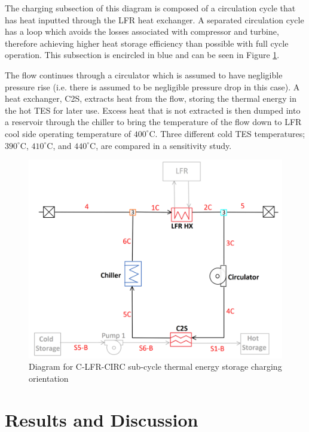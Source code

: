 \begin{paracol}{2}
\linenumbers
\switchcolumn

The charging subsection of this diagram is composed of a circulation cycle that has heat inputted through the LFR heat exchanger. A separated circulation cycle has a loop which avoids the losses associated with compressor and turbine, therefore achieving higher heat storage efficiency than possible with full cycle operation. This subsection is encircled in blue and can be seen in Figure \ref{c-lfr-circ-sub}.

The flow continues through a circulator which is assumed to have negligible pressure rise (i.e. there is assumed to be negligible pressure drop in this case). A heat exchanger, C2S, extracts heat from the flow, storing the thermal energy in the hot TES for later use. Excess heat that is not extracted is then dumped into a reservoir through the chiller to bring the temperature of the flow down to LFR cool side operating temperature of $400^{\circ}$C. Three different cold TES temperatures; $390^{\circ}$C, $410^{\circ}$C, and $440^{\circ}$C, are compared in a sensitivity study. 

\begin{figure}[H]
    \widefigure
    \includegraphics[width=0.7\linewidth]{Definitions/c-lfr-circ-sub.pdf}
    \caption{Diagram for C-LFR-CIRC sub-cycle thermal energy storage charging orientation\label{c-lfr-circ-sub}}
\end{figure}




\section{Results and Discussion}


\end{paracol}
